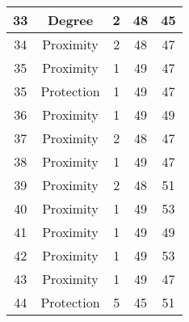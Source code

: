 \documentclass[results.tex]{subfiles}
\begin{document}
\begin{center}
\begin{tabular}{| c || c | c | c | c |}
            \hline
            33                      & Degree                       & 2                      & 48                      & 45                   \\
            \hline
            34                      & Proximity                    & 2                      & 48                      & 47                   \\
            \hline
            35                      & Proximity                    & 1                      & 49                      & 47                   \\
            \hline
            35                      & Protection                   & 1                      & 49                      & 47                   \\
            \hline
            36                      & Proximity                    & 1                      & 49                      & 49                   \\
            \hline
            37                      & Proximity                    & 2                      & 48                      & 47                   \\
            \hline
            38                      & Proximity                    & 1                      & 49                      & 47                   \\
            \hline
            39                      & Proximity                    & 2                      & 48                      & 51                   \\
            \hline
            40                      & Proximity                    & 1                      & 49                      & 53                   \\
            \hline
            41                      & Proximity                    & 1                      & 49                      & 49                   \\
            \hline
            42                      & Proximity                    & 1                      & 49                      & 53                   \\
            \hline
            43                      & Proximity                    & 1                      & 49                      & 47                   \\
            \hline
            44                      & Protection                   & 5                      & 45                      & 51                   \\

\end{tabular}
\end{center}
\end{document}

